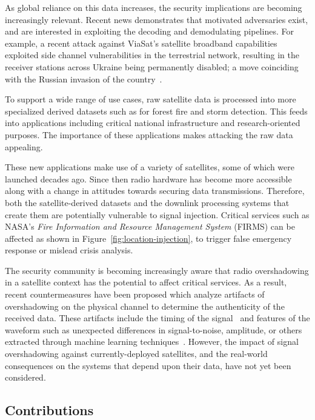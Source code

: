 As global reliance on this data increases, the security implications are becoming increasingly relevant.
Recent news demonstrates that motivated adversaries exist, and are interested in exploiting the decoding and demodulating pipelines.
For example, a recent attack against ViaSat's satellite broadband capabilities exploited side channel vulnerabilities in the terrestrial network, resulting in the receiver stations across Ukraine being permanently disabled; a move coinciding with the Russian invasion of the country~\cite{satcomAnalysis}.

To support a wide range of use cases, raw satellite data is processed into more specialized derived datasets such as for forest fire and storm detection.
This feeds into applications including critical national infrastructure and research-oriented purposes.
The importance of these applications makes attacking the raw data appealing.

These new applications make use of a variety of satellites, some of which were launched decades ago.
Since then radio hardware has become more accessible along with a change in attitudes towards securing data transmissions.
Therefore, both the satellite-derived datasets and the downlink processing systems that create them are potentially vulnerable to signal injection.
Critical services such as NASA's \textit{Fire Information and Resource Management System} (FIRMS) can be affected as shown in Figure~\ref{fig:location-injection}, to trigger false emergency response or mislead crisis analysis.

The security community is becoming increasingly aware that radio overshadowing in a satellite context has the potential to affect critical services.
As a result, recent countermeasures have been proposed which analyze artifacts of overshadowing on the physical channel to determine the authenticity of the received data.
These artifacts include the timing of the signal~\cite{jedermann2021orbit} and features of the waveform such as unexpected differences in signal-to-noise, amplitude, or others extracted through machine learning techniques~\cite{oligeri2020past}.
However, the impact of signal overshadowing against currently-deployed satellites, and the real-world consequences on the systems that depend upon their data, have not yet been considered.

\subsection{Contributions}

